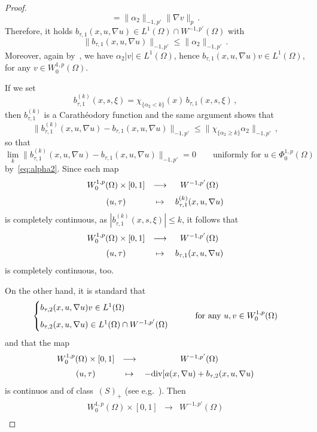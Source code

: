 \documentclass[twoside,reqno]{amsart}
\numberwithin{equation}{section}
\theoremstyle{definition}
\begin{document}
\begin{proof}
\[=
\|\alpha_2\|_{-1,p'} \|\nabla v\|_p \,.
\]
Therefore, it holds 
$b_{\tau,1}(x,u,\nabla u)\in L^1(\Omega)\cap W^{-1,p'}(\Omega)$ with
\[
\|b_{\tau,1}(x,u,\nabla u)\|_{-1,p'} \leq \|\alpha_2\|_{-1,p'}\,.
\]
Moreover, again by~\cite{brezis_browder1978}, we have
$\alpha_2|v|\in L^1(\Omega)$, 
hence $b_{\tau,1}(x,u,\nabla u)v\in L^1(\Omega)$,
for any $v\in W^{1,p}_0(\Omega)$.
\par
If we set
\[
b_{\tau,1}^{(k)}(x,s,\xi) = 
\chi_{\{\alpha_2<k\}}(x)\, b_{\tau,1}(x,s,\xi)\,,
\]
then $b_{\tau,1}^{(k)}$ is a Carath\'eodory function and the 
same argument shows that
\[
\|b_{\tau,1}^{(k)}(x,u,\nabla u)-b_{\tau,1}(x,u,\nabla u)\|_{-1,p'} 
\leq \|\chi_{\{\alpha_2\geq k\}}\alpha_2\|_{-1,p'}\,,
\]
so that
\[
\lim_k \|b_{\tau,1}^{(k)}(x,u,\nabla u)
- b_{\tau,1}(x,u,\nabla u)\|_{-1,p'} = 0 
\qquad\text{uniformly for $u\in \Phi^{1,p}_0(\Omega)$}
\]
by~\eqref{eq:alpha2}.
Since each map
\[
\begin{array}{ccc}
W^{1,p}_0(\Omega) \times[0,1]& \longrightarrow 
& W^{-1,p'}(\Omega) \\
\noalign{\medskip}
(u,\tau) & \mapsto & b_{\tau,1}^{(k)}(x,u,\nabla u)
\end{array}
\]
is completely continuous, as $|b_{\tau,1}^{(k)}(x,s,\xi)|\leq k$,
it follows that 
\[
\begin{array}{ccc}
W^{1,p}_0(\Omega) \times[0,1]& \longrightarrow 
& W^{-1,p'}(\Omega) \\
\noalign{\medskip}
(u,\tau) & \mapsto & b_{\tau,1}(x,u,\nabla u)
\end{array}
\]
is completely continuous, too.
\par
On the other hand, it is standard that
\[
\begin{cases}
b_{\tau,2}(x,u,\nabla u)v\in L^1(\Omega) \\
\noalign{\medskip}
b_{\tau,2}(x,u,\nabla u)\in L^1(\Omega)\cap W^{-1,p'}(\Omega) 
\end{cases}
\qquad\text{for any $u,v\in W^{1,p}_0(\Omega)$}
\]
and that the map
\[
\begin{array}{ccc}
W^{1,p}_0(\Omega)\times[0,1] & \longrightarrow 
& W^{-1,p'}(\Omega) \\
\noalign{\medskip}
(u,\tau) & \mapsto & 
-\mathrm{div}[a(x,\nabla u)+b_{\tau,2}(x,u,\nabla u)
\end{array}
\]
is continuos and of class~$(S)_+$
(see e.g.~\cite{browder1983, skrypnik1994}).
Then
\[
\begin{array}{ccc}
W^{1,p}_0(\Omega)\times[0,1] & \longrightarrow 
& W^{-1,p'}(\Omega) \\

\end{array}\]
\end{proof}
\end{document}
